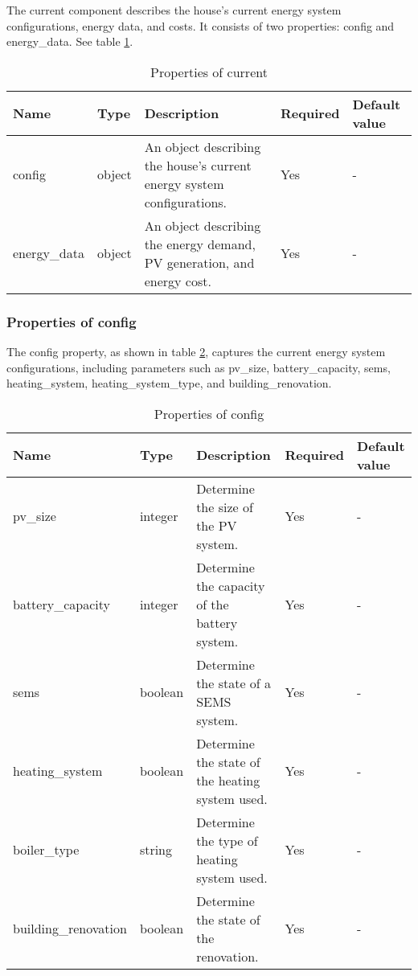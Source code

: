 The current component describes the house's current energy system configurations, energy data, and costs. 
It consists of two properties: config and energy\_data. 
See table \ref{tab:properties_current}.

\begin{table}[h!]
    \centering
    \small
    \begin{tabular}{ | p{} | p{} | p{} | p{} | p{} | } 
    \hline
    Name & Type & Description & Required & Default value \\
    \hline
    config & object & An object describing the house's current energy system configurations. & Yes & - \\
    \hline
    energy\_data & object & An object describing the energy demand, PV generation, and energy cost. & Yes & - \\
    \hline
    \end{tabular}
    \caption{Properties of current}
    \label{tab:properties_current}
\end{table}


\subsubsection{Properties of config}

The config property, as shown in table \ref{tab:properties_config}, captures the current energy system configurations, including parameters such as pv\_size, battery\_capacity, sems, heating\_system, heating\_system\_type, and building\_renovation.

\begin{table}[h!]
    \centering
    \small
    \begin{tabular}{ | p{} | p{} | p{} | p{} | p{} | } 
    \hline
    Name & Type & Description & Required & Default value \\
    \hline
    pv\_size & integer & Determine the size of the PV system. & Yes & - \\
    \hline
    battery\_capacity & integer & Determine the capacity of the battery system. & Yes & - \\
    \hline
    sems & boolean & Determine the state of a SEMS system. & Yes & - \\
    \hline
    heating\_system & boolean & Determine the state of the heating system used.	 & Yes & - \\
    \hline
    boiler\_type & string & Determine the type of heating system used. & Yes & - \\
    \hline
    building\_renovation & boolean & Determine the state of the renovation. & Yes & - \\
    \hline
    \end{tabular}
    \caption{Properties of config}
    \label{tab:properties_config}
\end{table}


